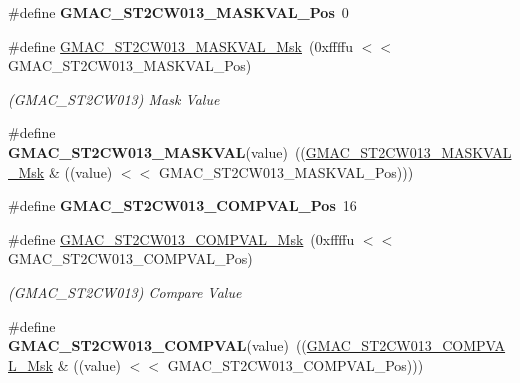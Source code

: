 \begin{DoxyCompactItemize}
\#define {\bfseries G\+M\+A\+C\+\_\+\+S\+T2\+C\+W013\+\_\+\+M\+A\+S\+K\+V\+A\+L\+\_\+\+Pos}~0
\item 
\mbox{\label{group__SAME70__GMAC_ga12b1ec8e33abdcf08c575e6e363e10c1}} 
\#define \mbox{\hyperlink{group__SAME70__GMAC_ga12b1ec8e33abdcf08c575e6e363e10c1}{G\+M\+A\+C\+\_\+\+S\+T2\+C\+W013\+\_\+\+M\+A\+S\+K\+V\+A\+L\+\_\+\+Msk}}~(0xffffu $<$$<$ G\+M\+A\+C\+\_\+\+S\+T2\+C\+W013\+\_\+\+M\+A\+S\+K\+V\+A\+L\+\_\+\+Pos)
\begin{DoxyCompactList}\small\item\em (G\+M\+A\+C\+\_\+\+S\+T2\+C\+W013) Mask Value \end{DoxyCompactList}\item 
\mbox{\label{group__SAME70__GMAC_gaa795a02cb6a39c03bd77b0c7caf22f8b}} 
\#define {\bfseries G\+M\+A\+C\+\_\+\+S\+T2\+C\+W013\+\_\+\+M\+A\+S\+K\+V\+AL}(value)~((\mbox{\hyperlink{group__SAMV71__GMAC_ga12b1ec8e33abdcf08c575e6e363e10c1}{G\+M\+A\+C\+\_\+\+S\+T2\+C\+W013\+\_\+\+M\+A\+S\+K\+V\+A\+L\+\_\+\+Msk}} \& ((value) $<$$<$ G\+M\+A\+C\+\_\+\+S\+T2\+C\+W013\+\_\+\+M\+A\+S\+K\+V\+A\+L\+\_\+\+Pos)))
\item 
\mbox{\label{group__SAME70__GMAC_ga8e63dcd8385fa2aabb39af0bfb3d267a}} 
\#define {\bfseries G\+M\+A\+C\+\_\+\+S\+T2\+C\+W013\+\_\+\+C\+O\+M\+P\+V\+A\+L\+\_\+\+Pos}~16
\item 
\mbox{\label{group__SAME70__GMAC_ga7d7fdcea04ba2bf079cc7801d1ef855a}} 
\#define \mbox{\hyperlink{group__SAME70__GMAC_ga7d7fdcea04ba2bf079cc7801d1ef855a}{G\+M\+A\+C\+\_\+\+S\+T2\+C\+W013\+\_\+\+C\+O\+M\+P\+V\+A\+L\+\_\+\+Msk}}~(0xffffu $<$$<$ G\+M\+A\+C\+\_\+\+S\+T2\+C\+W013\+\_\+\+C\+O\+M\+P\+V\+A\+L\+\_\+\+Pos)
\begin{DoxyCompactList}\small\item\em (G\+M\+A\+C\+\_\+\+S\+T2\+C\+W013) Compare Value \end{DoxyCompactList}\item 
\mbox{\label{group__SAME70__GMAC_gad017fa8197911182892a098e657eaaba}} 
\#define {\bfseries G\+M\+A\+C\+\_\+\+S\+T2\+C\+W013\+\_\+\+C\+O\+M\+P\+V\+AL}(value)~((\mbox{\hyperlink{group__SAMV71__GMAC_ga7d7fdcea04ba2bf079cc7801d1ef855a}{G\+M\+A\+C\+\_\+\+S\+T2\+C\+W013\+\_\+\+C\+O\+M\+P\+V\+A\+L\+\_\+\+Msk}} \& ((value) $<$$<$ G\+M\+A\+C\+\_\+\+S\+T2\+C\+W013\+\_\+\+C\+O\+M\+P\+V\+A\+L\+\_\+\+Pos)))

\end{DoxyCompactItemize}
